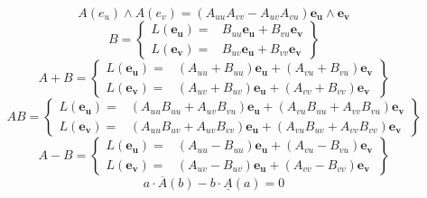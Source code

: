 \documentclass[10pt,fleqn]{report}
\newcommand{\lp}{\left (}
\newcommand{\rp}{\right )}
\newcommand{\W}{\wedge}
\newcommand{\f}[2]{{#1}\lp{#2}\rp}
\begin{document}
\begin{equation*} \f{A}{e_u}\W \f{A}{e_v} = \left ( A_{uu} A_{vv} - A_{uv} A_{vu}\right ) \boldsymbol{e_{u}\wedge e_{v}} \end{equation*}
\begin{equation*} B = \left \{ \begin{array}{ll} L \left ( \boldsymbol{e_{u}}\right ) =& B_{uu} \boldsymbol{e_{u}} + B_{vu} \boldsymbol{e_{v}} \\ L \left ( \boldsymbol{e_{v}}\right ) =& B_{uv} \boldsymbol{e_{u}} + B_{vv} \boldsymbol{e_{v}}  \end{array} \right \} \end{equation*}
\begin{equation*} A + B = \left \{ \begin{array}{ll} L \left ( \boldsymbol{e_{u}}\right ) =& \left ( A_{uu} + B_{uu}\right ) \boldsymbol{e_{u}} + \left ( A_{vu} + B_{vu}\right ) \boldsymbol{e_{v}} \\ L \left ( \boldsymbol{e_{v}}\right ) =& \left ( A_{uv} + B_{uv}\right ) \boldsymbol{e_{u}} + \left ( A_{vv} + B_{vv}\right ) \boldsymbol{e_{v}}  \end{array} \right \} \end{equation*}
\begin{equation*} AB = \left \{ \begin{array}{ll} L \left ( \boldsymbol{e_{u}}\right ) =& \left ( A_{uu} B_{uu} + A_{uv} B_{vu}\right ) \boldsymbol{e_{u}} + \left ( A_{vu} B_{uu} + A_{vv} B_{vu}\right ) \boldsymbol{e_{v}} \\ L \left ( \boldsymbol{e_{v}}\right ) =& \left ( A_{uu} B_{uv} + A_{uv} B_{vv}\right ) \boldsymbol{e_{u}} + \left ( A_{vu} B_{uv} + A_{vv} B_{vv}\right ) \boldsymbol{e_{v}}  \end{array} \right \} \end{equation*}
\begin{equation*} A - B = \left \{ \begin{array}{ll} L \left ( \boldsymbol{e_{u}}\right ) =& \left ( A_{uu} - B_{uu}\right ) \boldsymbol{e_{u}} + \left ( A_{vu} - B_{vu}\right ) \boldsymbol{e_{v}} \\ L \left ( \boldsymbol{e_{v}}\right ) =& \left ( A_{uv} - B_{uv}\right ) \boldsymbol{e_{u}} + \left ( A_{vv} - B_{vv}\right ) \boldsymbol{e_{v}}  \end{array} \right \} \end{equation*}
\begin{equation*} a\cdot \f{\overline{A}}{b}-b\cdot \f{\underline{A}}{a} = 0 \end{equation*}
\end{document}
